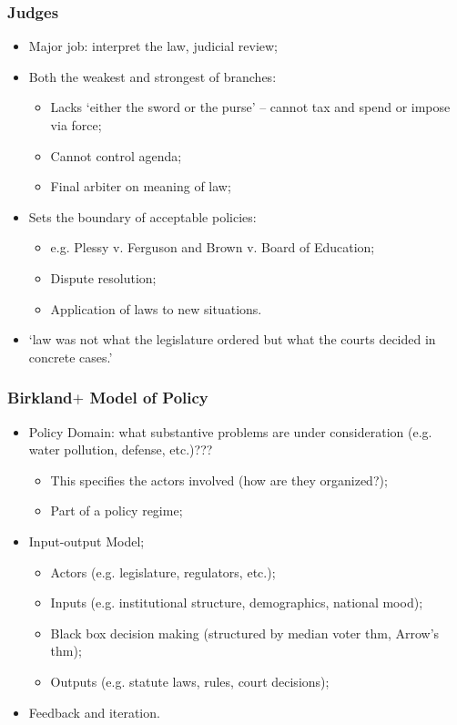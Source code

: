 \documentclass[aspectratio=169]{beamer}
\theoremstyle{principle}
\begin{document}
\begin{frame}
\frametitle{Judges}
\begin{itemize}
\item Major job: interpret the law, judicial review;
\bigskip
\item Both the weakest and strongest of branches:
\begin{itemize}
\item Lacks `either the sword or the purse' -- cannot tax and spend or impose via force;
\item Cannot control agenda;
\item Final arbiter on meaning of law;
\end{itemize}
\bigskip
\item Sets the boundary of acceptable policies:
\begin{itemize}
\item e.g. Plessy v. Ferguson and Brown v. Board of Education;
\item Dispute resolution;
\item Application of laws to new situations.
\end{itemize}
\bigskip
\item `law was not what the legislature ordered but what the courts decided in concrete cases.'
\end{itemize}
\end{frame}

\begin{frame}
\frametitle{Birkland$+$ Model of Policy}
\begin{itemize}
\item Policy Domain: what substantive problems are under consideration (e.g. water pollution, defense, etc.)???
\begin{itemize}
\item This specifies the actors involved (how are they organized?);
\item Part of a policy regime;
\end{itemize}
\bigskip
\item \color{black}Input-output Model;
\begin{itemize}
\item Actors (e.g. legislature, regulators, etc.);
\item Inputs (e.g. institutional structure, demographics, national mood);
\item Black box decision making (structured by median voter thm, Arrow's thm);
\item Outputs (e.g. statute laws, rules, court decisions);
\end{itemize}
\bigskip
\item Feedback and iteration.
\end{itemize}
\end{frame}
\end{document}
